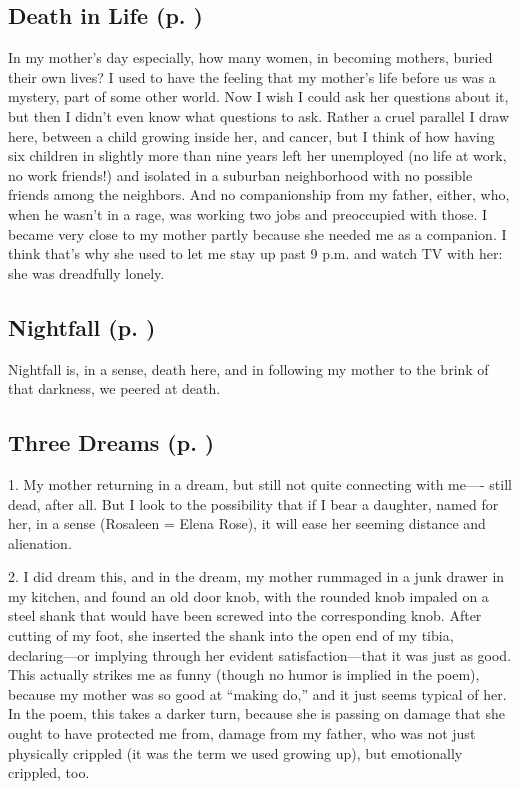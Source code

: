 \subsection*{Death in Life (p. \pageref{ch:deathinlife})}
In my mother's day especially, how many women, in becoming mothers, buried their
own lives? I used to have the feeling that my mother's life before us was a
mystery, part of some other world. Now I wish I could ask her questions about
it, but then I didn't even know what questions to ask. Rather a cruel parallel I
draw here, between a child growing inside her, and cancer, but I think of how
having six children in slightly more than nine years left her unemployed (no
life at work, no work friends!) and isolated in a suburban neighborhood with no
possible friends among the neighbors. And no companionship from my father,
either, who, when he wasn't in a rage, was working two jobs and preoccupied with
those. I became very close to my mother partly because she needed me as a
companion. I think that's why she used to let me stay up past 9 p.m. and watch
TV with her: she was dreadfully lonely.

\subsection*{Nightfall (p. \pageref{ch:nightfall})}
Nightfall is, in a sense, death here, and in following my mother to the brink of
that darkness, we peered at death.

\subsection*{Three Dreams (p. \pageref{ch:threedreams})}
1. My mother returning in a dream, but still not quite connecting with me----
still dead, after all. But I look to the possibility that if I bear a daughter,
named for her, in a sense (Rosaleen = Elena Rose), it will ease her seeming
distance and alienation.

2. I did dream this, and in the dream, my mother rummaged in a junk drawer in my
kitchen, and found an old door knob, with the rounded knob impaled on a steel
shank that would have been screwed into the corresponding knob. After cutting of
my foot, she inserted the shank into the open end of my tibia, declaring---or
implying through her evident satisfaction---that it was just as good. This
actually strikes me as funny (though no humor is implied in the poem), because
my mother was so good at ``making do,'' and it just seems typical of her. In the
poem, this takes a darker turn, because she is passing on damage that she ought
to have protected me from, damage from my father, who was not just physically
crippled (it was the term we used growing up), but emotionally crippled, too.

